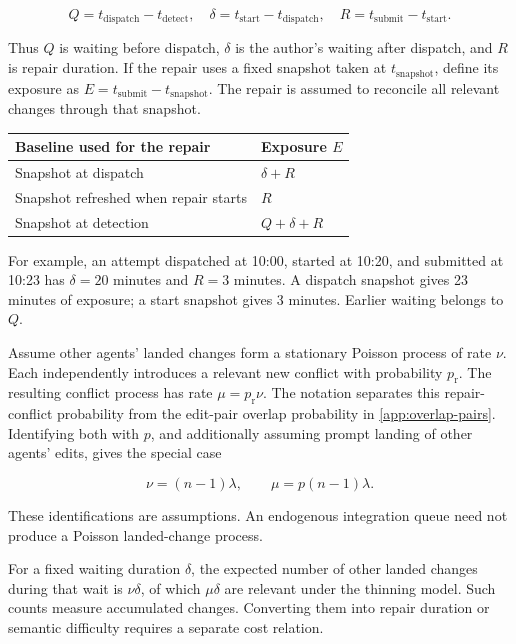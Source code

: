 \documentclass[pdflatex,sn-mathphys-ay]{sn-jnl}
\theoremstyle{thmstyleone}
\theoremstyle{thmstylethree}
\begin{document}
\begin{appendices}
\[
Q=t_{\mathrm{dispatch}}-t_{\mathrm{detect}},
\quad
\delta=t_{\mathrm{start}}-t_{\mathrm{dispatch}},
\quad
R=t_{\mathrm{submit}}-t_{\mathrm{start}}.
\]

Thus \(Q\) is waiting before dispatch, \(\delta\) is the author's waiting after dispatch, and \(R\) is repair duration. If the repair uses a fixed snapshot taken at \(t_{\mathrm{snapshot}}\), define its exposure as \(E=t_{\mathrm{submit}}-t_{\mathrm{snapshot}}\). The repair is assumed to reconcile all relevant changes through that snapshot.

\begin{center}
\centering\small
\setlength{\tabcolsep}{4pt}
\renewcommand{\arraystretch}{1.12}
\begin{tabularx}{\textwidth}{@{}l>{\raggedright\arraybackslash}X@{}}
\toprule
Baseline used for the repair & Exposure \(E\) \\
\midrule
Snapshot at dispatch & \(\delta+R\) \\
\addlinespace[3pt]
Snapshot refreshed when repair starts & \(R\) \\
\addlinespace[3pt]
Snapshot at detection & \(Q+\delta+R\) \\
\bottomrule
\end{tabularx}
\end{center}

For example, an attempt dispatched at 10:00, started at 10:20, and submitted at 10:23 has \(\delta=20\) minutes and \(R=3\) minutes. A dispatch snapshot gives 23 minutes of exposure; a start snapshot gives 3 minutes. Earlier waiting belongs to \(Q\).

Assume other agents' landed changes form a stationary Poisson process of rate \(\nu\). Each independently introduces a relevant new conflict with probability \(p_{\mathrm r}\). The resulting conflict process has rate \(\mu=p_{\mathrm r}\nu\). The notation separates this repair-conflict probability from the edit-pair overlap probability in \ref{app:overlap-pairs}. Identifying both with \(p\), and additionally assuming prompt landing of other agents' edits, gives the special case

\[
\nu=(n-1)\lambda,
\qquad
\mu=p(n-1)\lambda.
\]

These identifications are assumptions. An endogenous integration queue need not produce a Poisson landed-change process.

For a fixed waiting duration \(\delta\), the expected number of other landed changes during that wait is \(\nu\delta\), of which \(\mu\delta\) are relevant under the thinning model. Such counts measure accumulated changes. Converting them into repair duration or semantic difficulty requires a separate cost relation.


\end{appendices}
\end{document}
